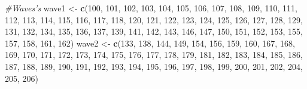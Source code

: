 \documentclass[
]{book}
\newenvironment{Shaded}{\begin{snugshade}}{\end{snugshade}}
\newcommand{\CommentTok}[1]{\textcolor[rgb]{0.56,0.35,0.01}{\textit{#1}}}
\newcommand{\DecValTok}[1]{\textcolor[rgb]{0.00,0.00,0.81}{#1}}
\newcommand{\KeywordTok}[1]{\textcolor[rgb]{0.13,0.29,0.53}{\textbf{#1}}}
\newcommand{\NormalTok}[1]{#1}
\newcommand{\StringTok}[1]{\textcolor[rgb]{0.31,0.60,0.02}{#1}}
\begin{document}
\begin{Shaded}
\begin{Highlighting}[]
\CommentTok{#Waves's}
\NormalTok{wave1 <-}\StringTok{ }\KeywordTok{c}\NormalTok{(}\DecValTok{100}\NormalTok{, }\DecValTok{101}\NormalTok{,    }\DecValTok{102}\NormalTok{,    }\DecValTok{103}\NormalTok{,    }\DecValTok{104}\NormalTok{,    }\DecValTok{105}\NormalTok{,    }\DecValTok{106}\NormalTok{,    }\DecValTok{107}\NormalTok{,    }\DecValTok{108}\NormalTok{,    }\DecValTok{109}\NormalTok{,    }\DecValTok{110}\NormalTok{,    }\DecValTok{111}\NormalTok{,    }\DecValTok{112}\NormalTok{,    }\DecValTok{113}\NormalTok{,    }\DecValTok{114}\NormalTok{,    }\DecValTok{115}\NormalTok{,    }\DecValTok{116}\NormalTok{,    }\DecValTok{117}\NormalTok{,    }\DecValTok{118}\NormalTok{,    }\DecValTok{120}\NormalTok{,    }\DecValTok{121}\NormalTok{,    }\DecValTok{122}\NormalTok{,    }\DecValTok{123}\NormalTok{,}
           \DecValTok{124}\NormalTok{, }\DecValTok{125}\NormalTok{,    }\DecValTok{126}\NormalTok{,    }\DecValTok{127}\NormalTok{,    }\DecValTok{128}\NormalTok{,    }\DecValTok{129}\NormalTok{,    }\DecValTok{131}\NormalTok{,    }\DecValTok{132}\NormalTok{,    }\DecValTok{134}\NormalTok{,    }\DecValTok{135}\NormalTok{,    }\DecValTok{136}\NormalTok{,    }\DecValTok{137}\NormalTok{,    }\DecValTok{139}\NormalTok{,    }\DecValTok{141}\NormalTok{,    }\DecValTok{142}\NormalTok{,    }\DecValTok{143}\NormalTok{,    }\DecValTok{146}\NormalTok{,    }\DecValTok{147}\NormalTok{,    }\DecValTok{150}\NormalTok{,    }\DecValTok{151}\NormalTok{,    }\DecValTok{152}\NormalTok{,    }\DecValTok{153}\NormalTok{,    }\DecValTok{155}\NormalTok{,}
           \DecValTok{157}\NormalTok{, }\DecValTok{158}\NormalTok{,    }\DecValTok{161}\NormalTok{,    }\DecValTok{162}\NormalTok{)}
\NormalTok{wave2 <-}\StringTok{ }\KeywordTok{c}\NormalTok{(}\DecValTok{133}\NormalTok{, }\DecValTok{138}\NormalTok{,  }\DecValTok{144}\NormalTok{,  }\DecValTok{149}\NormalTok{,  }\DecValTok{154}\NormalTok{,  }\DecValTok{156}\NormalTok{,  }\DecValTok{159}\NormalTok{,  }\DecValTok{160}\NormalTok{,  }\DecValTok{167}\NormalTok{,  }\DecValTok{168}\NormalTok{,  }\DecValTok{169}\NormalTok{,  }\DecValTok{170}\NormalTok{,  }\DecValTok{171}\NormalTok{,  }\DecValTok{172}\NormalTok{,  }\DecValTok{173}\NormalTok{,  }\DecValTok{174}\NormalTok{,  }\DecValTok{175}\NormalTok{,  }\DecValTok{176}\NormalTok{,  }\DecValTok{177}\NormalTok{,  }\DecValTok{178}\NormalTok{,  }\DecValTok{179}\NormalTok{,  }\DecValTok{181}\NormalTok{,  }\DecValTok{182}\NormalTok{,}
           \DecValTok{183}\NormalTok{, }\DecValTok{184}\NormalTok{,  }\DecValTok{185}\NormalTok{,  }\DecValTok{186}\NormalTok{,  }\DecValTok{187}\NormalTok{,  }\DecValTok{188}\NormalTok{,  }\DecValTok{189}\NormalTok{,  }\DecValTok{190}\NormalTok{,  }\DecValTok{191}\NormalTok{,  }\DecValTok{192}\NormalTok{,  }\DecValTok{193}\NormalTok{,  }\DecValTok{194}\NormalTok{,  }\DecValTok{195}\NormalTok{,  }\DecValTok{196}\NormalTok{,  }\DecValTok{197}\NormalTok{,  }\DecValTok{198}\NormalTok{,  }\DecValTok{199}\NormalTok{,  }\DecValTok{200}\NormalTok{,  }\DecValTok{201}\NormalTok{,  }\DecValTok{202}\NormalTok{,  }\DecValTok{204}\NormalTok{,  }\DecValTok{205}\NormalTok{,  }\DecValTok{206}\NormalTok{)}

\end{Highlighting}
\end{Shaded}
\end{document}
